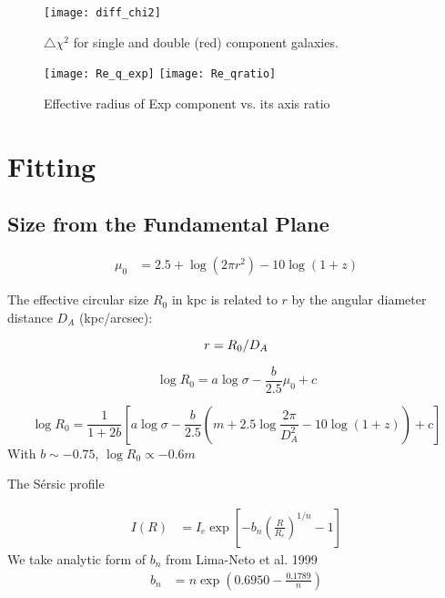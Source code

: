 \documentclass[iop]{emulateapj}
\newcommand{\Sersic}{S\'ersic}
\newcommand{\chisq}{\ensuremath{\chi^2}}
\begin{document}
\begin{figure}[]
    \begin{center}
        \texttt{[image: diff\_chi2]}
    \end{center}
    \caption{$\triangle\chisq$ for single and double (red) component galaxies.}
    \label{fig:DiffChisq}
\end{figure}

\begin{figure*}[]
    \begin{center}
        \texttt{[image: Re\_q\_exp]}
        \texttt{[image: Re\_qratio]}
    \end{center}
    \caption{Effective radius of Exp component vs. its axis ratio}
    \label{fig:Req}
\end{figure*}

\section{Fitting}
\subsection{Size from the Fundamental Plane}



\begin{eqnarray}
       \mu_0 &= 2.5 + \log(2 \pi r^2) - 10 \log(1+z)
\end{eqnarray}

The effective circular size $R_0$ in kpc is related to $r$ by
the angular diameter distance $D_A$ (kpc/arcsec):

\begin{equation}
    r = R_0 / D_A \\
\end{equation}

\begin{equation}
    \log R_0 = a \log \sigma - \frac{b}{2.5} \mu_0 + c
\end{equation}

\begin{equation}
    \log R_0 = \frac{1}{1 + 2 b} \left[ a\log \sigma
        - \frac{b}{2.5} \left(m + 2.5\log \frac{2\pi}{D_A^2} - 10 \log (1+z)\right)
        + c \right]
\end{equation}
With $b \sim -0.75$, $\log R_0 \propto -0.6 m$


The \Sersic{} profile

\begin{align}
    I(R) &= I_e \exp \left[ -b_n \left( \frac{R}{R_e} \right)^{1/n} - 1 \right]
\end{align}
We take analytic form of $b_n$ from Lima-Neto et al. 1999
\begin{align}
    b_n &= n \exp\left(0.6950 - \frac{0.1789}{n}\right)
\end{align}
\end{document}
